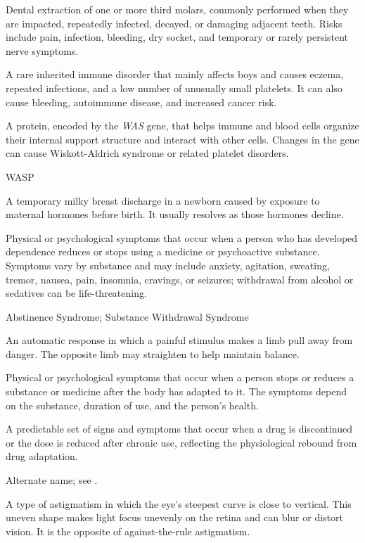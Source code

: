  Dental extraction of one or more third molars, commonly performed when they are impacted, repeatedly infected, decayed, or damaging adjacent teeth. Risks include pain, infection, bleeding, dry socket, and temporary or rarely persistent nerve symptoms.

 A rare inherited immune disorder that mainly affects boys and causes eczema, repeated infections, and a low number of unusually small platelets. It can also cause bleeding, autoimmune disease, and increased cancer risk.

 A protein, encoded by the \textit{WAS} gene, that helps immune and blood cells organize their internal support structure and interact with other cells. Changes in the gene can cause Wiskott-Aldrich syndrome or related platelet disorders.

\synonyms
WASP

 A temporary milky breast discharge in a newborn caused by exposure to maternal hormones before birth. It usually resolves as those hormones decline.

 Physical or psychological symptoms that occur when a person who has developed dependence reduces or stops using a medicine or psychoactive substance. Symptoms vary by substance and may include anxiety, agitation, sweating, tremor, nausea, pain, insomnia, cravings, or seizures; withdrawal from alcohol or sedatives can be life-threatening.

\synonyms
Abstinence Syndrome; Substance Withdrawal Syndrome

 An automatic response in which a painful stimulus makes a limb pull away from danger. The opposite limb may straighten to help maintain balance.

 Physical or psychological symptoms that occur when a person stops or reduces a substance or medicine
after the body has adapted to it. The symptoms depend on the substance, duration of use,
and the person’s health.

 A predictable set of signs and symptoms that occur when a drug is discontinued or the
dose is reduced after chronic use, reflecting the physiological rebound from drug
adaptation.

 Alternate name; see .

 A type of astigmatism in which the eye's
steepest curve is close to vertical. This uneven shape makes light focus
unevenly on the retina and can blur or distort vision. It is the opposite of
against-the-rule astigmatism.

